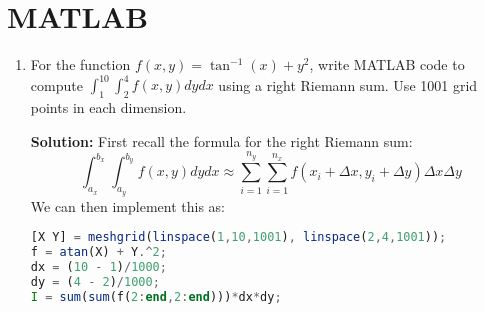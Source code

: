 \documentclass[letterpaper, 11pt]{article}
\begin{document}
\section{MATLAB}
\begin{enumerate}
\item For the function $f(x,y) = \tan^{-1}(x) + y^2$, write MATLAB code to compute $\int_1^{10} \int_2^4 f(x,y)dydx$ using a right Riemann sum. Use 1001 grid points in each dimension. 
\par \textbf{Solution:} First recall the formula for the right Riemann sum:
\[ \int_{a_x}^{b_x} \int_{a_y}^{b_y} f(x,y)dydx \approx \sum_{i=1}^{n_y} \sum_{i=1}^{n_x} f(x_i + \Delta x,y_i + \Delta y) \Delta x \Delta y \]
We can then implement this as:
\begin{lstlisting}[language = Octave]
[X Y] = meshgrid(linspace(1,10,1001), linspace(2,4,1001));
f = atan(X) + Y.^2;
dx = (10 - 1)/1000;
dy = (4 - 2)/1000;
I = sum(sum(f(2:end,2:end)))*dx*dy;
\end{lstlisting}

%
%
%
%
%
%
%
%



\end{enumerate}
\end{document}
